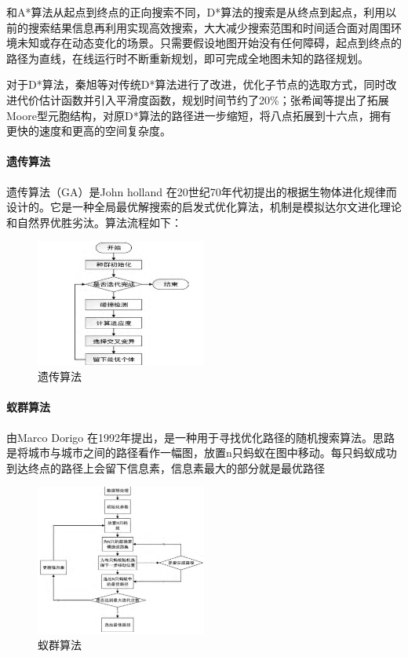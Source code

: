 \documentclass{report}
\begin{document}
和A*算法从起点到终点的正向搜索不同，D*算法的搜索是从终点到起点，利用以前的搜索结果信息再利用实现高效搜索，大大减少搜索范围和时间适合面对周围环境未知或存在动态变化的场景。只需要假设地图开始没有任何障碍，起点到终点的路径为直线，在线运行时不断重新规划，即可完成全地图未知的路径规划。

对于D*算法，秦旭等对传统D*算法进行了改进，优化子节点的选取方式，同时改进代价估计函数并引入平滑度函数，规划时间节约了20\%；张希闻等提出了拓展Moore型元胞结构，对原D*算法的路径进一步缩短，将八点拓展到十六点，拥有更快的速度和更高的空间复杂度\cite{jh4}。
\paragraph{遗传算法}

遗传算法（GA）是John holland 在20世纪70年代初提出的根据生物体进化规律而设计的\cite{jh5}。它是一种全局最优解搜索的启发式优化算法，机制是模拟达尔文进化理论和自然界优胜劣汰。算法流程如下：
\begin{figure}[ht]
  \centering
  \includegraphics[width=0.5\textwidth]{figures/yichuan.png}
  \caption{遗传算法}
\end{figure}
\paragraph{蚁群算法}

由Marco Dorigo 在1992年提出，是一种用于寻找优化路径的随机搜索算法。思路是将城市与城市之间的路径看作一幅图，放置n只蚂蚁在图中移动。每只蚂蚁成功到达终点的路径上会留下信息素，信息素最大的部分就是最优路径
\begin{figure}[ht]
  \centering
  \includegraphics[width=0.5\textwidth]{figures/yiqun.png}
  \caption{蚁群算法 }
\end{figure}
\end{document}
